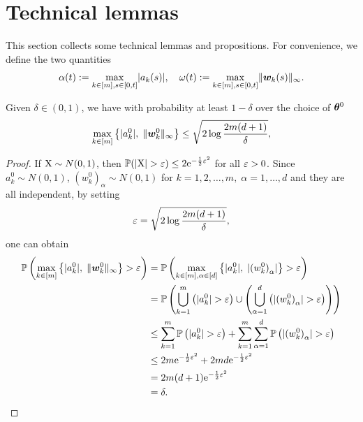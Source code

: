 \documentclass{article}
\begin{document}
\section{Technical lemmas}
This section collects some technical lemmas and propositions. For convenience, we define the two quantities
\begin{equation}
    \alpha(t):=\max\limits_{k\in[m],s\in[0,t]}\lvert a_k(s)\rvert, \quad \omega(t):=\max\limits_{k\in[m],s\in[0,t]}\lVert\bm{w}_k(s)\rVert_{\infty}.
\end{equation}
\begin{lem}\label{lem..InitialParameter}
    Given $\delta\in(0,1)$, we have with probability at least $1-\delta$ over the choice of $\bm{\theta}^0$
    \begin{equation}\label{eqn:lem1}
        \max\limits_{k\in[m]}\left\{\lvert a_k^0\rvert,\;\lVert\bm{w}_k^0\rVert_{\infty}\right \}\leq \sqrt{2\log\frac{2m(d+1)}{\delta}},
    \end{equation}
\end{lem}
\begin{proof}
    If $\textnormal{X} \sim N(0, 1)$, then $\mathbb{P}(\lvert\textnormal{X}\rvert > \varepsilon) \leq 2\mathrm{e}^{-\frac{1}{2}\varepsilon^2}$ for all $\varepsilon > 0$. Since $a^0_k\sim N(0,1)$, ${(w_k^0)}_{\alpha}\sim N(0,1)$ for $k=1, 2, \ldots, m,\; \alpha =1,\ldots,d$ and they are all independent, by setting
    \begin{equation}
        \varepsilon = \sqrt{2\log\frac{2m(d+1)}{\delta}},
    \end{equation}
    one can obtain
    \begin{equation}
        \begin{aligned}
            \mathbb{P}\left(\max\limits_{k\in[m]}\left\{\lvert a_k^0\rvert,\; \lVert\bm{w}_k^0\rVert_{\infty}\right \}>\varepsilon\right)
             & = \mathbb{P}\left(\max\limits_{k\in[m],\alpha\in[d]}\left\{\lvert a_k^0\rvert,\; \lvert{(w^0_k)}_{\alpha}\rvert\right \}>\varepsilon\right)                                            \\
             & = \mathbb{P}\left(\bigcup\limits_{k=1}^m\left(\lvert a_k^0\rvert>\varepsilon\right)\cup\left(\bigcup\limits_{\alpha=1}^d\left(\lvert{(w_k^0)}_{\alpha}\rvert>\varepsilon\right)\right)\right) \\
             & \leq \sum_{k=1}^m \mathbb{P}\left(\lvert a_k^0\rvert>\varepsilon\right) + \sum_{k=1}^m\sum_{\alpha=1}^d \mathbb{P}\left(\lvert{(w^0_k)}_{\alpha}\rvert>\varepsilon\right)                          \\
             & \leq 2m \mathrm{e}^{-\frac{1}{2}\varepsilon^2} + 2md \mathrm{e}^{-\frac{1}{2}\varepsilon^2}                                                                                                 \\
             & = 2m(d+1)\mathrm{e}^{-\frac{1}{2}\varepsilon^2}                                                                                                                              \\
             & = \delta.
        \end{aligned}
    \end{equation}
\end{proof}
\end{document}

